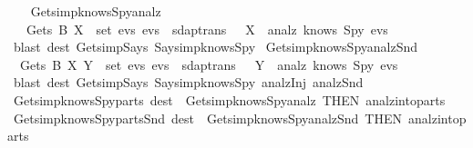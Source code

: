 \begin{isabellebody}
  \isadelimproof
  \isanewline
  \endisadelimproof
  \ \ \isanewline
  \isamarkupfalse%
  \ Gets{\isacharunderscore}imp{\isacharunderscore}knows{\isacharunderscore}Spy{\isacharunderscore}analz\ {\isacharcolon}\isanewline
  \ \ {\isachardoublequoteopen}{\isasymlbrakk}\ Gets\ B\ X\ {\isasymin}\ set\ evs{\isacharsemicolon}\ evs\ {\isasymin}\ sdaptrans\ {\isasymrbrakk}\ {\isasymLongrightarrow}\ X\ {\isasymin}\ analz\ {\isacharparenleft}knows\ Spy\ evs{\isacharparenright}{\isachardoublequoteclose}\isanewline
  \isadelimproof
  \endisadelimproof
  \isatagproof
  \isamarkupfalse%
  \ {\isacharparenleft}blast\ dest{\isacharbang}{\isacharcolon}\ Gets{\isacharunderscore}imp{\isacharunderscore}Says\ Says{\isacharunderscore}imp{\isacharunderscore}knows{\isacharunderscore}Spy{\isacharparenright}%
  \endisatagproof
  {\isafoldproof}%
  \isadelimproof
  \isanewline
  \endisadelimproof
  \isanewline
  \isamarkupfalse%
  \ Gets{\isacharunderscore}imp{\isacharunderscore}knows{\isacharunderscore}Spy{\isacharunderscore}analz{\isacharunderscore}Snd\ {\isacharcolon}\isanewline
  \ {\isachardoublequoteopen}{\isasymlbrakk}\ Gets\ B\ {\isasymlbrace}X{\isacharcomma}\ Y{\isasymrbrace}\ {\isasymin}\ set\ evs{\isacharsemicolon}\ evs\ {\isasymin}\ sdaptrans\ {\isasymrbrakk}\ {\isasymLongrightarrow}\ Y\ {\isasymin}\ analz\ {\isacharparenleft}knows\ Spy\ evs{\isacharparenright}{\isachardoublequoteclose}\isanewline
  \isadelimproof
  \isanewline
  \ \ %
  \endisadelimproof
  \isatagproof
  \isamarkupfalse%
  \ {\isacharparenleft}blast\ dest{\isacharbang}{\isacharcolon}\ Gets{\isacharunderscore}imp{\isacharunderscore}Says\ Says{\isacharunderscore}imp{\isacharunderscore}knows{\isacharunderscore}Spy\ analz{\isachardot}Inj\ analz{\isachardot}Snd{\isacharparenright}\isanewline
  \isamarkupfalse%
  \endisatagproof
  {\isafoldproof}%
  \isadelimproof
  \isanewline
  \endisadelimproof
  \isanewline
  \isamarkupfalse%
  \ Gets{\isacharunderscore}imp{\isacharunderscore}knows{\isacharunderscore}Spy{\isacharunderscore}parts\ {\isacharbrackleft}dest{\isacharbrackright}\ {\isacharequal}\ Gets{\isacharunderscore}imp{\isacharunderscore}knows{\isacharunderscore}Spy{\isacharunderscore}analz\ {\isacharbrackleft}THEN\ analz{\isacharunderscore}into{\isacharunderscore}parts{\isacharbrackright}\isanewline
  \isamarkupfalse%
  \ Gets{\isacharunderscore}imp{\isacharunderscore}knows{\isacharunderscore}Spy{\isacharunderscore}parts{\isacharunderscore}Snd\ {\isacharbrackleft}dest{\isacharbrackright}\ {\isacharequal}\ Gets{\isacharunderscore}imp{\isacharunderscore}knows{\isacharunderscore}Spy{\isacharunderscore}analz{\isacharunderscore}Snd\ {\isacharbrackleft}THEN\ analz{\isacharunderscore}into{\isacharunderscore}parts{\isacharbrackright}\isanewline

\end{isabellebody}
